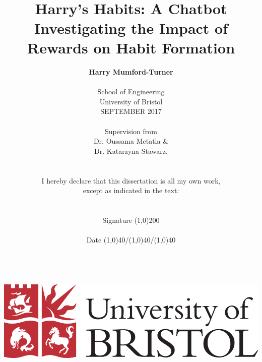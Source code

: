 

\date{} %

\title{\huge{\textbf{\\\\\\Harry's Habits: A Chatbot Investigating the Impact of Rewards on Habit Formation}}}
\author{\textbf{Harry Mumford-Turner}\\
\\
School of Engineering\\
University of Bristol\\
SEPTEMBER 2017\\
\\
Supervision from\\
Dr. Oussama Metatla \&\\Dr. Katarzyna Stawarz.
\\
\\\\
I hereby declare that this dissertation is all my own work,\\
except as indicated in the text:\\
\\
\\
Signature \line(1,0){200}\\
\\
Date \line(1,0){40}/\line(1,0){40}/\line(1,0){40}\\
\\
\\
\\
\\
\includegraphics[scale=0.29]{resources/UoB-logo.png}}
